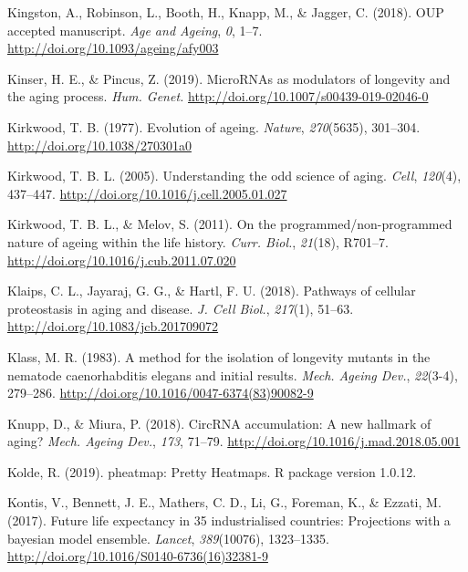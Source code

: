 \documentclass[12pt,twoside]{unicam}
\begin{document}
\begin{cslreferences}
\leavevmode\hypertarget{ref-Kingston2018}{}%
Kingston, A., Robinson, L., Booth, H., Knapp, M., \& Jagger, C. (2018). OUP accepted manuscript. \emph{Age and Ageing}, \emph{0}, 1--7. \url{http://doi.org/10.1093/ageing/afy003}

\leavevmode\hypertarget{ref-Kinser2019}{}%
Kinser, H. E., \& Pincus, Z. (2019). MicroRNAs as modulators of longevity and the aging process. \emph{Hum. Genet.} \url{http://doi.org/10.1007/s00439-019-02046-0}

\leavevmode\hypertarget{ref-Kirkwood1977}{}%
Kirkwood, T. B. (1977). Evolution of ageing. \emph{Nature}, \emph{270}(5635), 301--304. \url{http://doi.org/10.1038/270301a0}

\leavevmode\hypertarget{ref-Kirkwood2005}{}%
Kirkwood, T. B. L. (2005). Understanding the odd science of aging. \emph{Cell}, \emph{120}(4), 437--447. \url{http://doi.org/10.1016/j.cell.2005.01.027}

\leavevmode\hypertarget{ref-Kirkwood2011}{}%
Kirkwood, T. B. L., \& Melov, S. (2011). On the programmed/non-programmed nature of ageing within the life history. \emph{Curr. Biol.}, \emph{21}(18), R701--7. \url{http://doi.org/10.1016/j.cub.2011.07.020}

\leavevmode\hypertarget{ref-Klaips2018}{}%
Klaips, C. L., Jayaraj, G. G., \& Hartl, F. U. (2018). Pathways of cellular proteostasis in aging and disease. \emph{J. Cell Biol.}, \emph{217}(1), 51--63. \url{http://doi.org/10.1083/jcb.201709072}

\leavevmode\hypertarget{ref-Klass1983}{}%
Klass, M. R. (1983). A method for the isolation of longevity mutants in the nematode caenorhabditis elegans and initial results. \emph{Mech. Ageing Dev.}, \emph{22}(3-4), 279--286. \url{http://doi.org/10.1016/0047-6374(83)90082-9}

\leavevmode\hypertarget{ref-Knupp2018}{}%
Knupp, D., \& Miura, P. (2018). CircRNA accumulation: A new hallmark of aging? \emph{Mech. Ageing Dev.}, \emph{173}, 71--79. \url{http://doi.org/10.1016/j.mad.2018.05.001}

\leavevmode\hypertarget{ref-Kolde2019}{}%
Kolde, R. (2019). pheatmap: Pretty Heatmaps. R package version 1.0.12.

\leavevmode\hypertarget{ref-Kontis2017}{}%
Kontis, V., Bennett, J. E., Mathers, C. D., Li, G., Foreman, K., \& Ezzati, M. (2017). Future life expectancy in 35 industrialised countries: Projections with a bayesian model ensemble. \emph{Lancet}, \emph{389}(10076), 1323--1335. \url{http://doi.org/10.1016/S0140-6736(16)32381-9}


\end{cslreferences}
\end{document}
